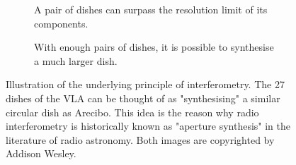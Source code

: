 \begin{figure}[ht]
\centering
\begin{subfigure}{.43\textwidth}
\caption{\label{fig.baseline.image} A pair of dishes can surpass the resolution limit of its components.}
\end{subfigure}
\hfill
\begin{subfigure}{.43\textwidth}
\caption{\label{fig.arecibo.vla} With enough pairs of dishes, it is possible to synthesise a much larger dish.}
\end{subfigure}
\caption{\label{fig.aperture.synthesis} Illustration of the underlying principle of interferometry. The 27 dishes of the VLA can be thought of as "synthesising" a similar circular dish as Arecibo. This idea is the reason why radio interferometry is historically known as "aperture synthesis" in the literature of radio astronomy. Both images are copyrighted by Addison Wesley.}
\end{figure}

